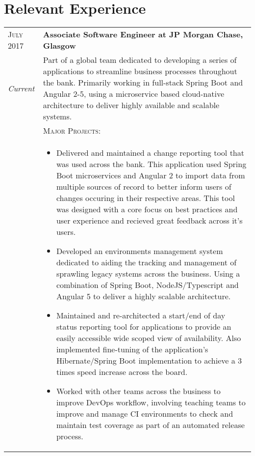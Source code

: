 \section{Relevant Experience}

\begin{tabular}{p{60pt}|p{11cm}}
	\hspace*{\fill}\textsc{July 2017} & \textbf{Associate Software Engineer at JP Morgan Chase, Glasgow} \\
	
	\hspace*{\fill}\emph{Current}& \small{
		Part of a global team dedicated to developing a series of applications to streamline business processes throughout the bank. Primarily working in full-stack Spring Boot and Angular 2-5, using a microservice based cloud-native architecture to deliver highly available and scalable systems.
	} \\

	\ & \vspace{1pt}\textsc{Major Projects}: \\

	&\vspace{-0.9em}\begin{itemize}[itemsep=0pt,topsep=0pt,leftmargin=*]\small
		\item Delivered and maintained a change reporting tool that was used across the bank. This application used Spring Boot microservices and Angular 2 to import data from multiple sources of record to better inform users of changes occuring in their respective areas. This tool was designed with a core focus on best practices and user experience and recieved great feedback across it's users. 
		\item Developed an environments management system dedicated to aiding the tracking and management of sprawling legacy systems across the business. Using a combination of Spring Boot, NodeJS/Typescript and Angular 5 to deliver a highly scalable architecture.
		\item Maintained and re-architected a start/end of day status reporting tool for applications to provide an easily accessible wide scoped view of availability. Also implemented fine-tuning of the application's Hibernate/Spring Boot implementation to achieve a 3 times speed increase across the board.
		\item Worked with other teams across the business to improve DevOps workflow, involving teaching teams to improve and manage CI environments to check and maintain test coverage as part of an automated release process.
	\end{itemize}\vspace{-1.5em}

\end{tabular} \\ \\ \\
